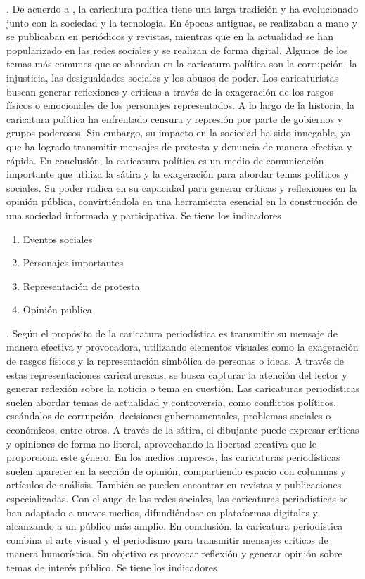 \documentclass[12pt,a4paper]{article}
\begin{document}
\noindent\textbf{\dimiiii}.	De acuerdo a \cite{grose_principios_2011}, la caricatura política tiene una larga tradición y ha evolucionado junto con la sociedad y la tecnología. En épocas antiguas, se realizaban a mano y se publicaban en periódicos y revistas, mientras que en la actualidad se han popularizado en las redes sociales y se realizan de forma digital.
Algunos de los temas más comunes que se abordan en la caricatura política son la corrupción, la injusticia, las desigualdades sociales y los abusos de poder. Los caricaturistas buscan generar reflexiones y críticas a través de la exageración de los rasgos físicos o emocionales de los personajes representados.
A lo largo de la historia, la caricatura política ha enfrentado censura y represión por parte de gobiernos y grupos poderosos. Sin embargo, su impacto en la sociedad ha sido innegable, ya que ha logrado transmitir mensajes de protesta y denuncia de manera efectiva y rápida.
En conclusión, la caricatura política es un medio de comunicación importante que utiliza la sátira y la exageración para abordar temas políticos y sociales. Su poder radica en su capacidad para generar críticas y reflexiones en la opinión pública, convirtiéndola en una herramienta esencial en la construcción de una sociedad informada y participativa. Se tiene los indicadores

\begin{enumerate}
\item  Eventos sociales
\item  Personajes importantes
\item  Representación de protesta
\item  Opinión publica
\end{enumerate}

\noindent\textbf{\dimiii}. Según \cite{gray_caricaturas_2015}	el propósito de la caricatura periodística es transmitir su mensaje de manera efectiva y provocadora, utilizando elementos visuales como la exageración de rasgos físicos y la representación simbólica de personas o ideas. A través de estas representaciones caricaturescas, se busca capturar la atención del lector y generar reflexión sobre la noticia o tema en cuestión.
Las caricaturas periodísticas suelen abordar temas de actualidad y controversia, como conflictos políticos, escándalos de corrupción, decisiones gubernamentales, problemas sociales o económicos, entre otros. A través de la sátira, el dibujante puede expresar críticas y opiniones de forma no literal, aprovechando la libertad creativa que le proporciona este género.
En los medios impresos, las caricaturas periodísticas suelen aparecer en la sección de opinión, compartiendo espacio con columnas y artículos de análisis. También se pueden encontrar en revistas y publicaciones especializadas. Con el auge de las redes sociales, las caricaturas periodísticas se han adaptado a nuevos medios, difundiéndose en plataformas digitales y alcanzando a un público más amplio.
En conclusión, la caricatura periodística combina el arte visual y el periodismo para transmitir mensajes críticos de manera humorística. Su objetivo es provocar reflexión y generar opinión sobre temas de interés público. Se tiene los indicadores
\end{document}
